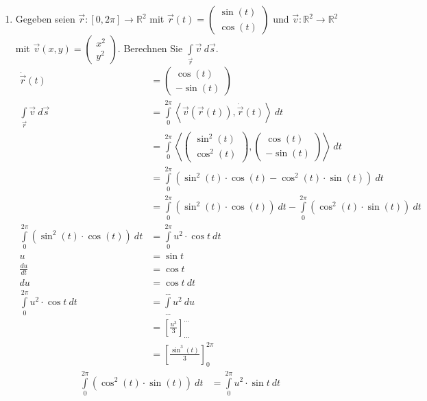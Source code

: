 \documentclass[12pt]{article}
\begin{document}
\begin{enumerate}[start=1,label={\bfseries Frage \arabic*:},leftmargin=1in]
    \item Gegeben seien $\Vec{r}:[0,2\pi] \to \mathbb{R}^2$ mit $\Vec{r}(t) = \begin{pmatrix} \sin{(t)} \\ \cos{(t)} \end{pmatrix}$ und $\Vec{v}:\mathbb{R}^2 \to \mathbb{R}^2$ mit $\Vec{v}(x,y)= \begin{pmatrix} x^2 \\ y^2 \end{pmatrix}$. Berechnen Sie $\int\limits_{\Vec{r}} \Vec{v} \: d\Vec{s}$.
    \begin{align*}
        \Dot{\Vec{r}}(t) &= \begin{pmatrix} \cos{(t)} \\ -\sin{(t)} \end{pmatrix} \\
        \int\limits_{\Vec{r}} \Vec{v} \: d\Vec{s} &= \int\limits_0^{2\pi} \left< \Vec{v}(\Vec{r}(t)) , \Dot{\Vec{r}}(t) \right> \: dt \\
        &= \int\limits_0^{2\pi} \left< \begin{pmatrix} \sin^2{(t)} \\ \cos^2{(t)} \end{pmatrix} , \begin{pmatrix} \cos{(t)} \\ -\sin{(t)} \end{pmatrix} \right> \: dt \\
        &= \int\limits_0^{2\pi} (\sin^2{(t)} \cdot \cos{(t)} - \cos^2{(t)} \cdot \sin{(t)}) \: dt \\
        &= \int\limits_0^{2\pi} (\sin^2{(t)} \cdot \cos{(t)}) \: dt - \int\limits_0^{2\pi} (\cos^2{(t)} \cdot \sin{(t)}) \: dt \\
        \int\limits_0^{2\pi} (\sin^2{(t)} \cdot \cos{(t)}) \: dt &= \int\limits_0^{2\pi} u^2 \cdot \cos{t} \: dt \\
        u &= \sin{t} \\
        \frac{du}{dt} &= \cos{t} \\
        du &= \cos{t} \: dt \\
        \int\limits_0^{2\pi} u^2 \cdot \cos{t} \: dt &= \int\limits_{...}^{...} u^2 \: du \\
        &= \left[\frac{u^3}{3}\right]_{...}^{...} \\
        &= \left[\frac{\sin^3{(t)}}{3}\right]_{0}^{2\pi}
    \end{align*}
    \begin{align*}
        \int\limits_0^{2\pi} (\cos^2{(t)} \cdot \sin{(t)}) \: dt &= \int\limits_0^{2\pi} u^2 \cdot \sin{t} \: dt \\

\end{align*}
\end{enumerate}
\end{document}
